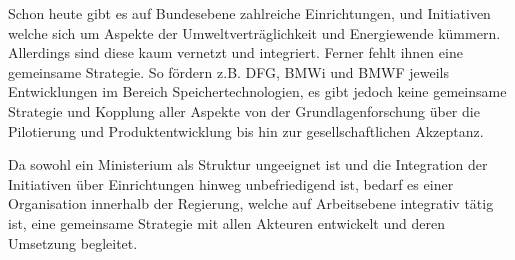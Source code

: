 Schon heute gibt es auf Bundesebene zahlreiche Einrichtungen, und Initiativen welche sich um Aspekte der Umweltverträglichkeit und Energiewende kümmern.
Allerdings sind diese kaum vernetzt und integriert.
Ferner fehlt ihnen eine gemeinsame Strategie.
So fördern z.B. DFG, BMWi und BMWF jeweils Entwicklungen im Bereich Speichertechnologien, es gibt jedoch keine gemeinsame Strategie und Kopplung aller Aspekte von der Grundlagenforschung über die Pilotierung und Produktentwicklung bis hin zur gesellschaftlichen Akzeptanz.

Da sowohl ein Ministerium als Struktur ungeeignet ist und die Integration der Initiativen über Einrichtungen hinweg unbefriedigend ist, bedarf es einer Organisation innerhalb der Regierung, welche auf Arbeitsebene integrativ tätig ist, eine gemeinsame Strategie mit allen Akteuren entwickelt und deren Umsetzung begleitet.
